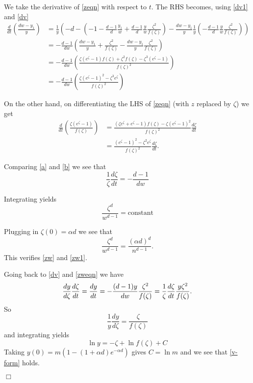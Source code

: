 \documentclass[11pt]{article}
\newenvironment{proof}{{\bf Proof:}}{\hfill\mbox{$\Box$}}
\def\a{\alpha}
\def\z{\zeta}
\newcommand{\brac}[1]{\left(#1\right)}
\newcommand{\bfrac}[2]{\brac{\frac{#1}{#2}}}
\begin{document}
\begin{proof}
We take the derivative of \eqref{zeqn} with respect to $t$.
The RHS becomes, using \eqref{dv1} and \eqref{dv}
\begin{align}
\frac{d}{dt}\bfrac{dw-y_1}{y} &= \frac{1}{y}\brac{-d-\brac{-1-\frac{d-1}{d}\frac{y_1}{w} + \frac{d-1}{d}\frac{y}{w}\frac{\z^2}{f(\z)}} - 
\frac{dw-y_1}{y}\frac{1}{y}\brac{-\frac{d-1}{d}\frac{y}{w}\frac{\z^2}{f(\z)}}}\nonumber\\
&= -\frac{d-1}{dw}\brac{\frac{dw-y_1}{y} + \frac{\z^2}{f(\z)}-\frac{dw-y_1}{y}\frac{\z^2}{f(\z)}}\nonumber\\
&= -\frac{d-1}{dw}\bfrac{\z(e^\z-1)f(\z)+ \z^2f(\z)-\z^3(e^\z-1)}{f(\z)^2}\nonumber\\
&= -\frac{d-1}{dw}\bfrac{\z(e^\z-1)^2 - \z^3e^\z}{f(\z)^2}\label{a}
\end{align} 

On the other hand, on differentiating the LHS of \eqref{zeqn} (with $z$ replaced by $\z$) we get
\begin{align}
\frac{d}{dt}\bfrac{\z(e^\z-1)}{f(\z)} &= \frac{(\z e^\z+e^\z-1)f(\z) - \z(e^\z-1)^2}{f(\z)^2}\frac{d\z}{dt}\nonumber\\
&= \frac{(e^\z-1)^2-\z^2e^\z}{f(\z)^2}\frac{d\z}{dt}.\label{b}
\end{align}

Comparing \eqref{a} and \eqref{b} we see that
\begin{equation}\label{zweqn}
\frac{1}{\z}\frac{d\z}{dt} = -\frac{d-1}{dw}
\end{equation}

Integrating yields
\begin{equation*}
\frac{\z^d}{w^{d-1}} = \textrm{constant}
\end{equation*}

Plugging in $\z(0) = \a d$ we see that 
$$\frac{\z^d}{w^{d-1}} = \frac{(\a d)^d}{n^{d-1}}.$$
This verifies \eqref{zw} and \eqref{zw1}.

Going back to \eqref{dv} and \eqref{zweqn} we have 
$$\frac{dy}{d\z}\frac{d\z}{dt} = \frac{dy}{dt} = -\frac{(d-1)y}{dw}\frac{\z^2}{f(\z)}\\
= \frac{1}{\z}\frac{d\z}{dt}\frac{y\z^2}{f(\z)}.$$
So 
$$\frac{1}{y}\frac{dy}{d\z} = \frac{\z}{f(\z)}$$ 
and integrating yields
\begin{equation*}
\ln y = -\z + \ln f(\z) + C
\end{equation*}
Taking $y(0) = m(1-(1+\a d)e^{-\a d})$ gives $C = \ln m$
and we see that \eqref{v-form} holds.


\end{proof}
\end{document}

